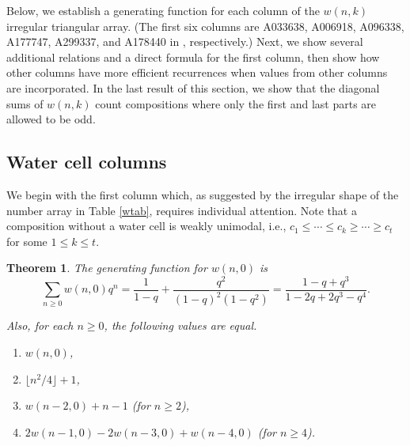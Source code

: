 \documentclass[]{interact}
\theoremstyle{plain}
\numberwithin{equation}{section} %
\newtheorem{theorem}[thm]{Theorem}
\numberwithin{table}{section} %
\numberwithin{figure}{section}
\begin{document}
Below, we establish a generating function for each column of the $w(n,k)$ irregular triangular array.  (The first six columns are A033638, A006918, A096338, A177747, A299337, and A178440 in \cite{o}, respectively.)  Next, we show several additional relations and a direct formula for the first column, then show how other columns have more efficient recurrences when values from other columns are incorporated.  In the last result of this section, we show that the diagonal sums of $w(n,k)$ count compositions where only the first and last parts are allowed to be odd.


\subsection{Water cell columns}
We begin with the first column which, as suggested by the irregular shape of the number array in Table \ref{wtab}, requires individual attention.  Note that a composition without a water cell is weakly unimodal, i.e., $c_1 \le \cdots \le c_k \ge \cdots \ge c_t$ for some $1 \le k \le t$.

\begin{theorem} \label{wum}
The generating function for $w(n,0)$ is
\begin{equation}
 \sum_{n \ge 0} w(n,0) q^n = \frac{1}{1-q} + \frac{q^2}{(1-q)^2(1-q^2)} = \frac{1-q+q^3}{1 - 2 q + 2 q^3 - q^4}. \label{w0gf}
 \end{equation}

Also, for each $n \ge 0$, the following values are equal.
\begin{enumerate}
\renewcommand{\theenumi}{\alph{enumi}}
\item $w(n,0)$,
\item $\lfloor n^2/4 \rfloor + 1$,
\item $w(n-2,0) + n - 1$ (for $n \ge 2$),
\item $2w(n-1,0) - 2w(n-3,0) + w(n-4,0)$ (for $n \ge 4$).
\end{enumerate}
\end{theorem}
\end{document}
